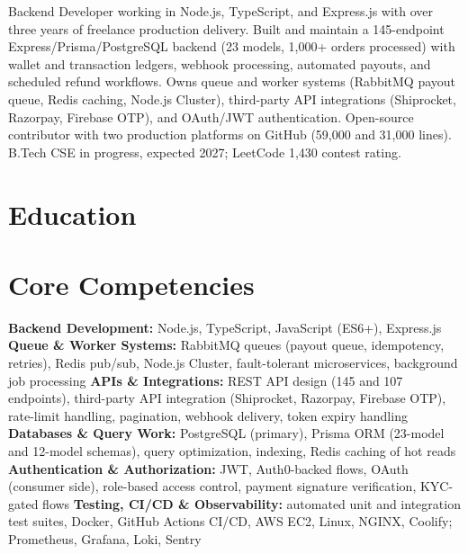 \documentclass[11pt,a4paper,sans]{moderncv}
\begin{document}
\makecvtitle


\vspace{4pt}
\small{Backend Developer working in Node.js, TypeScript, and Express.js with over three years of freelance production delivery. Built and maintain a 145-endpoint Express/Prisma/PostgreSQL backend (23 models, 1,000+ orders processed) with wallet and transaction ledgers, webhook processing, automated payouts, and scheduled refund workflows. Owns queue and worker systems (RabbitMQ payout queue, Redis caching, Node.js Cluster), third-party API integrations (Shiprocket, Razorpay, Firebase OTP), and OAuth/JWT authentication. Open-source contributor with two production platforms on GitHub (59,000 and 31,000 lines). B.Tech CSE in progress, expected 2027; LeetCode 1,430 contest rating.}


\section{Education}
\vspace{1pt}


\section{Core Competencies}
\vspace{1pt}
\raggedright
\textbf{Backend Development:} Node.js, TypeScript, JavaScript (ES6+), Express.js \textbar{}
\textbf{Queue \& Worker Systems:} RabbitMQ queues (payout queue, idempotency, retries), Redis pub/sub, Node.js Cluster, fault-tolerant microservices, background job processing \textbar{}
\textbf{APIs \& Integrations:} REST API design (145 and 107 endpoints), third-party API integration (Shiprocket, Razorpay, Firebase OTP), rate-limit handling, pagination, webhook delivery, token expiry handling \textbar{}
\textbf{Databases \& Query Work:} PostgreSQL (primary), Prisma ORM (23-model and 12-model schemas), query optimization, indexing, Redis caching of hot reads \textbar{}
\textbf{Authentication \& Authorization:} JWT, Auth0-backed flows, OAuth (consumer side), role-based access control, payment signature verification, KYC-gated flows \textbar{}
\textbf{Testing, CI/CD \& Observability:} automated unit and integration test suites, Docker, GitHub Actions CI/CD, AWS EC2, Linux, NGINX, Coolify; Prometheus, Grafana, Loki, Sentry
\par\normalfont
\end{document}
